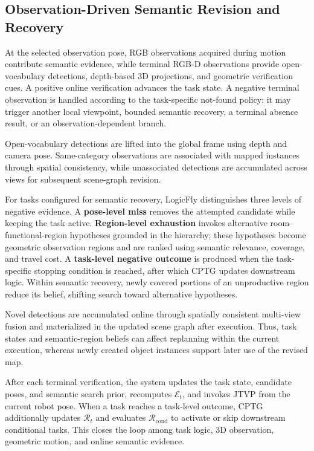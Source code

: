 \documentclass[letterpaper,10pt,journal]{IEEEtran}
\begin{document}
\subsection{Observation-Driven Semantic Revision and Recovery}
\label{sec:recovery}

At the selected observation pose, RGB observations acquired during motion contribute semantic evidence, while terminal RGB-D observations provide open-vocabulary detections, depth-based 3D projections, and geometric verification cues. A positive online verification advances the task state. A negative terminal observation is handled according to the task-specific not-found policy: it may trigger another local viewpoint, bounded semantic recovery, a terminal absence result, or an observation-dependent branch.

Open-vocabulary detections are lifted into the global frame using depth and camera pose. Same-category observations are associated with mapped instances through spatial consistency, while unassociated detections are accumulated across views for subsequent scene-graph revision.

For tasks configured for semantic recovery, LogicFly distinguishes three levels of negative evidence. A \textbf{pose-level miss} removes the attempted candidate while keeping the task active. \textbf{Region-level exhaustion} invokes alternative room--functional-region hypotheses grounded in the hierarchy; these hypotheses become geometric observation regions and are ranked using semantic relevance, coverage, and travel cost. A \textbf{task-level negative outcome} is produced when the task-specific stopping condition is reached, after which CPTG updates downstream logic. Within semantic recovery, newly covered portions of an unproductive region reduce its belief, shifting search toward alternative hypotheses.

Novel detections are accumulated online through spatially consistent multi-view fusion and materialized in the updated scene graph after execution. Thus, task states and semantic-region beliefs can affect replanning within the current execution, whereas newly created object instances support later use of the revised map.

After each terminal verification, the system updates the task state, candidate poses, and semantic search prior, recomputes $\mathcal E_t$, and invokes JTVP from the current robot pose. When a task reaches a task-level outcome, CPTG additionally updates $\mathcal R_t$ and evaluates $\mathcal R_{\mathrm{cond}}$ to activate or skip downstream conditional tasks. This closes the loop among task logic, 3D observation, geometric motion, and online semantic evidence.
\end{document}
